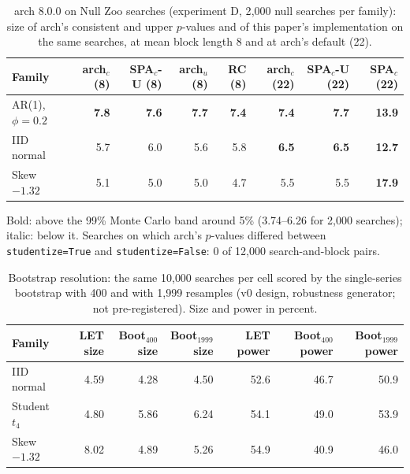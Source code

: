 \begin{table}[t]
\centering
\footnotesize
\setlength{\tabcolsep}{3.5pt}
\caption{arch 8.0.0 on Null Zoo searches (experiment D, 2{,}000 null searches per family): size of arch's consistent and upper $p$-values and of this paper's implementation on the same searches, at mean block length 8 and at arch's default (22).}
\label{tab:arch}
\begin{tabular}{lrrrrrrr}
\toprule
Family & arch$_c$ (8) & SPA$_c$-U (8) & arch$_u$ (8) & RC (8) & arch$_c$ (22) & SPA$_c$-U (22) & SPA$_c$ (22) \\
\midrule
AR(1), $\phi=0.2$ & \textbf{7.8} & \textbf{7.6} & \textbf{7.7} & \textbf{7.4} & \textbf{7.4} & \textbf{7.7} & \textbf{13.9} \\
IID normal & 5.7 & 6.0 & 5.6 & 5.8 & \textbf{6.5} & \textbf{6.5} & \textbf{12.7} \\
Skew $-1.32$ & 5.1 & 5.0 & 5.0 & 4.7 & 5.5 & 5.5 & \textbf{17.9} \\
\bottomrule
\end{tabular}
\par\smallskip\begin{minipage}{0.97\linewidth}\footnotesize Bold: above the 99\% Monte Carlo band around 5\% (3.74--6.26 for 2{,}000 searches); italic: below it. Searches on which arch's $p$-values differed between \texttt{studentize=True} and \texttt{studentize=False}: 0 of 12{,}000 search-and-block pairs.\end{minipage}
\end{table}

\begin{table}[t]
\centering
\footnotesize
\setlength{\tabcolsep}{3.5pt}
\caption{Bootstrap resolution: the same 10{,}000 searches per cell scored by the single-series bootstrap with 400 and with 1,999 resamples (v0 design, robustness generator; not pre-registered). Size and power in percent.}
\label{tab:bootres}
\begin{tabular}{lrrrrrr}
\toprule
Family & LET size & Boot$_{400}$ size & Boot$_{1999}$ size & LET power & Boot$_{400}$ power & Boot$_{1999}$ power \\
\midrule
IID normal & 4.59 & 4.28 & 4.50 & 52.6 & 46.7 & 50.9 \\
Student $t_4$ & 4.80 & 5.86 & 6.24 & 54.1 & 49.0 & 53.9 \\
Skew $-1.32$ & 8.02 & 4.89 & 5.26 & 54.9 & 40.9 & 46.0 \\
\bottomrule
\end{tabular}
\end{table}

